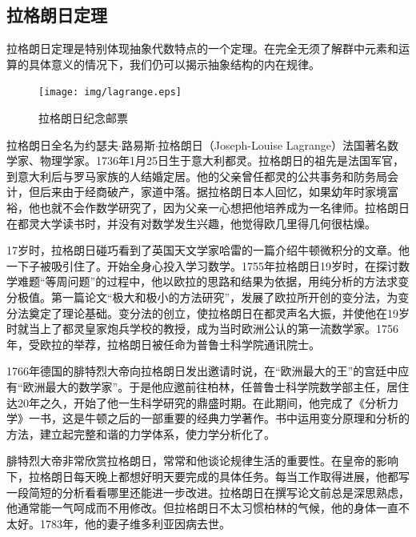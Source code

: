 \documentclass{article}
\begin{document}
\begin{Exercise}
\end{Exercise}

\subsection{拉格朗日定理}

拉格朗日定理是特别体现抽象代数特点的一个定理。在完全无须了解群中元素和运算的具体意义的情况下，我们仍可以揭示抽象结构的内在规律。

\begin{figure}
 \raggedright %
 \texttt{[image: img/lagrange.eps]}
 \captionsetup{labelformat=empty}
 \caption{拉格朗日纪念邮票}
 \label{fig:Lagrange}
\end{figure}

拉格朗日全名为约瑟夫$\cdot$路易斯$\cdot$拉格朗日（Joseph-Louise Lagrange）法国著名数学家、物理学家。1736年1月25日生于意大利都灵。拉格朗日的祖先是法国军官，到意大利后与罗马家族的人结婚定居。他的父亲曾任都灵的公共事务和防务局会计，但后来由于经商破产，家道中落。据拉格朗日本人回忆，如果幼年时家境富裕，他也就不会作数学研究了，因为父亲一心想把他培养成为一名律师。拉格朗日在都灵大学读书时，并没有对数学发生兴趣，他觉得欧几里得几何很枯燥。

17岁时，拉格朗日碰巧看到了英国天文学家哈雷的一篇介绍牛顿微积分的文章。他一下子被吸引住了。开始全身心投入学习数学。1755年拉格朗日19岁时，在探讨数学难题“等周问题”的过程中，他以欧拉的思路和结果为依据，用纯分析的方法求变分极值。第一篇论文“极大和极小的方法研究”，发展了欧拉所开创的变分法，为变分法奠定了理论基础。变分法的创立，使拉格朗日在都灵声名大振，并使他在19岁时就当上了都灵皇家炮兵学校的教授，成为当时欧洲公认的第一流数学家。1756年，受欧拉的举荐，拉格朗日被任命为普鲁士科学院通讯院士。

1766年德国的腓特烈大帝向拉格朗日发出邀请时说，在“欧洲最大的王”的宫廷中应有“欧洲最大的数学家”。于是他应邀前往柏林，任普鲁士科学院数学部主任，居住达20年之久，开始了他一生科学研究的鼎盛时期。在此期间，他完成了《分析力学》一书，这是牛顿之后的一部重要的经典力学著作。书中运用变分原理和分析的方法，建立起完整和谐的力学体系，使力学分析化了。

腓特烈大帝非常欣赏拉格朗日，常常和他谈论规律生活的重要性。在皇帝的影响下，拉格朗日每天晚上都想好明天要完成的具体任务。每当工作取得进展，他都写一段简短的分析看看哪里还能进一步改进。拉格朗日在撰写论文前总是深思熟虑，他通常能一气呵成而不用修改。但拉格朗日不太习惯柏林的气候，他的身体一直不太好。1783年，他的妻子维多利亚因病去世。
\end{document}
